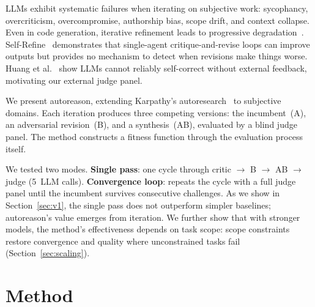\documentclass[10pt,twocolumn]{article}
\begin{document}
LLMs exhibit systematic failures when iterating on subjective work: sycophancy, overcriticism, overcompromise, authorship bias, scope drift, and context collapse. Even in code generation, iterative refinement leads to progressive degradation~\cite{slopcodebench}. Self-Refine~\cite{selfrefine} demonstrates that single-agent critique-and-revise loops can improve outputs but provides no mechanism to detect when revisions make things worse. Huang et al.~\cite{huang2023} show LLMs cannot reliably self-correct without external feedback, motivating our external judge panel.

We present autoreason, extending Karpathy's autoresearch~\cite{autoresearch} to subjective domains. Each iteration produces three competing versions: the incumbent~(A), an adversarial revision~(B), and a synthesis~(AB), evaluated by a blind judge panel. The method constructs a fitness function through the evaluation process itself.

We tested two modes. \textbf{Single pass}: one cycle through critic $\to$ B $\to$ AB $\to$ judge (5~LLM calls). \textbf{Convergence loop}: repeats the cycle with a full judge panel until the incumbent survives consecutive challenges. As we show in Section~\ref{sec:v1}, the single pass does not outperform simpler baselines; autoreason's value emerges from iteration. We further show that with stronger models, the method's effectiveness depends on task scope: scope constraints restore convergence and quality where unconstrained tasks fail (Section~\ref{sec:scaling}).

\section{Method}
\end{document}
